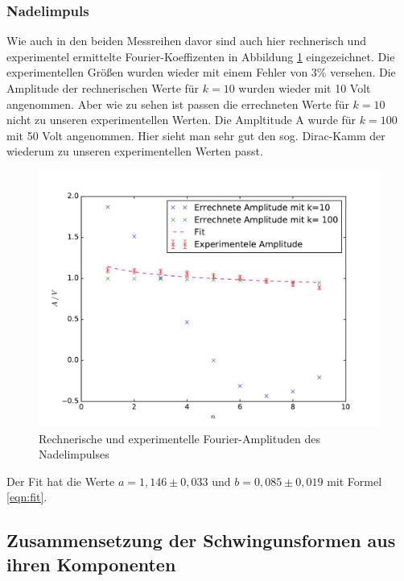\subsubsection{Nadelimpuls}
Wie auch in den beiden Messreihen davor sind auch hier rechnerisch und experimentel
ermittelte Fourier-Koeffizenten in Abbildung \ref{fig:np} eingezeichnet. Die experimentellen
Größen wurden wieder mit einem Fehler von 3\% versehen. Die Amplitude der rechnerischen Werte
für $ k = 10$ wurden wieder mit 10 Volt angenommen. Aber wie zu sehen ist passen die errechneten
Werte für $k = 10$ nicht zu unseren experimentellen Werten. Die Ampltitude A wurde für $k = 100$
mit 50 Volt angenommen. Hier sieht man sehr gut den sog. Dirac-Kamm der wiederum zu unseren
experimentellen Werten passt.
\begin{figure}
  \centering
  \includegraphics[width= \textwidth]{Plots/Nadelimpulsplot.pdf}
  \caption{Rechnerische und experimentelle Fourier-Amplituden des Nadelimpulses}
  \label{fig:np}
\end{figure}
\FloatBarrier
Der Fit hat die Werte $ a = 1,146 \pm 0,033 $ und $ b = 0,085 \pm 0,019$ mit Formel \eqref{eqn:fit}.

\subsection{Zusammensetzung der Schwingunsformen aus ihren Komponenten}
